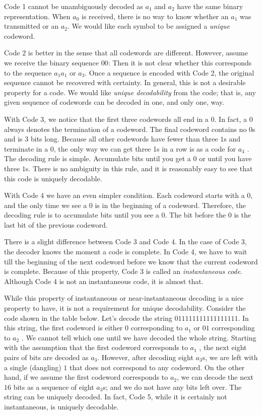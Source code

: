 Code 1 cannot be unambiguously decoded as $a_1$ and $a_2$ have the same binary representation. When $a_0$ is received, there is no way to know whether an $a_1$ was transmitted or an $a_2$. We would like each symbol to be assigned a \emph{unique} codeword.

Code 2 is better in the sense that all codewords are different. However, assume we receive the binary sequence $00$: Then it is not clear whether this corresponds to the sequence $a_1 a_1$ or $a_3$. Once a sequence is encoded with Code 2, the original sequence cannot be recovered with certainty. In general, this is not a desirable property for a code. We would like \emph{unique decodability} from the code; that is, any given sequence of codewords can be decoded in one, and only one, way.

With Code 3, we notice that the first three codewords all end in a $0$. In fact, a $0$ always denotes the termination of a codeword. The final codeword contains no $0$s and is $3$ bits long. Because all other codewords have fewer than three $1$s and terminate in a $0$, the only way we can get three 1s in a row is as a code for $a_4$ . The decoding rule is simple. Accumulate bits until you get a $0$ or until you have three $1$s. There is no ambiguity in this rule, and it is reasonably easy to see that this code is uniquely decodable.

With Code 4 we have an even simpler condition. Each codeword starts with a $0$, and the only time we see a $0$ is in the beginning of a codeword. Therefore, the decoding rule is to accumulate bits until you see a $0$. The bit before the 0 is the last bit of the previous codeword.

There is a slight difference between Code 3 and Code 4. In the case of Code 3, the decoder knows the moment a code is complete. In Code 4, we have to wait till the beginning of the next codeword before we know that the current codeword is complete. Because of this property, Code 3 is called an \emph{instantaneous code}. Although Code 4 is not an instantaneous code, it is almost that.

While this property of instantaneous or near-instantaneous decoding is a nice property to have, it is not a requirement for unique decodability. Consider the code shown in the table below. Let’s decode the string $011111111111111111$. In this string, the first codeword is either $0$ corresponding to $a_1$ or $01$ corresponding to $a_2$ . We cannot tell which one until we have decoded the whole string. Starting with the assumption that the first codeword corresponds to $a_1$ , the next eight pairs of bits are decoded as $a_3$. However, after decoding eight $a_3$s, we are left with a single (dangling) $1$ that does not correspond to any codeword. On the other hand, if we assume the first codeword corresponds to $a_2$, we can decode the next $16$ bits as a sequence of eight $a_3$s; and we do not have any bits left over. The string can be uniquely decoded. In fact, Code 5, while it is certainly not instantaneous, is uniquely decodable.

